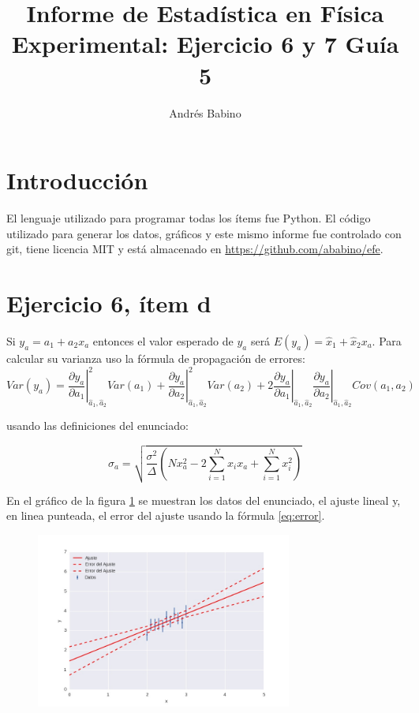 \title{Informe de Estadística en Física Experimental: Ejercicio 6 y 7 Guía 5}
\author{Andr\'es Babino}


\maketitle
\section{Introducción}
El lenguaje utilizado para programar todas los ítems fue Python.
El código utilizado para generar los datos, gráficos y este mismo informe fue controlado con git, tiene licencia MIT y está almacenado en \url{https://github.com/ababino/efe}.

\section*{Ejercicio 6, ítem d}
Si $y_a=a_1 + a_2 x_a$ entonces el valor esperado de $y_a$ será $E(y_a)=\hat x_1 + \hat x_2 x_a$.
Para calcular su varianza uso la fórmula de propagación de errores:
\begin{equation}
Var(y_a) = \left. \frac{\partial y_a}{\partial a_1}\right|_{\hat a_1, \hat a_2}^2 Var(a_1) + \left. \frac{\partial y_a}{\partial a_2}\right|_{\hat a_1, \hat a_2}^2 Var(a_2) + 2 \left. \frac{\partial y_a}{\partial a_1}\right|_{\hat a_1, \hat a_2} \left. \frac{\partial y_a}{\partial a_2}\right|_{\hat a_1, \hat a_2} Cov(a_1, a_2)
\label{eq:prop}
\end{equation}

usando las definiciones del enunciado:

\begin{equation}
\sigma_a = \sqrt{\frac{\sigma^2}{\Delta} \left(N x_a^2 -2 \sum_{i=1}^N x_i x_a +\sum_{i=1}^N x_i^2\right)}
\label{eq:error}
\end{equation}

En el gráfico de la figura \ref{fig:e6d} se muestran los datos del enunciado, el ajuste lineal y, en linea punteada, el error del ajuste usando la fórmula \ref{eq:error}.

\begin{figure}
\centering
\includegraphics[width=0.75\textwidth]{ej6d.jpg}
\caption[]{}
\label{fig:e6d}
\end{figure}

